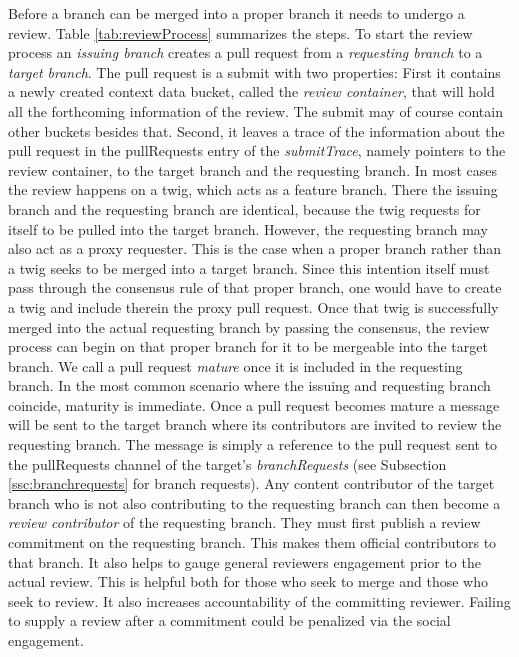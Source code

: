 Before a branch can be merged into a proper branch it needs to undergo a review. Table \ref{tab:reviewProcess} summarizes the steps.
To start the review process an \textit{issuing branch} creates a pull request from a \textit{requesting branch} to a \textit{target branch}. The pull request is a submit with two properties: First it contains a newly created context data bucket, called the \textit{review container}, that will hold all the forthcoming information of the review. The submit may of course contain other buckets besides that. Second, it leaves a trace of the information about the pull request in the pullRequests entry of the \textit{submitTrace}, namely pointers to the review container, to the target branch and the requesting branch. In most cases the review happens on a twig, which acts as a feature branch. There the issuing branch and the requesting branch are identical, because the twig requests for itself to be pulled into the target branch. However, the requesting branch may also act as a proxy requester. This is the case when a proper branch rather than a twig seeks to be merged into a target branch. Since this intention itself must pass through the consensus rule of that proper branch, one would have to create a twig and include therein the proxy pull request. Once that twig is successfully merged into the actual requesting branch by passing the consensus, the review process can begin on that proper branch for it to be mergeable into the target branch. We call a pull request \textit{mature} once it is included in the requesting branch. In the most common scenario where the issuing and requesting branch coincide, maturity is immediate. 
Once a pull request becomes mature a message will be sent to the target branch  where its contributors are invited to review the requesting branch. The message is simply a reference to the pull request sent to the pullRequests channel of the target's \textit{branchRequests} (see Subsection \ref{ssc:branchrequests} for branch requests).
Any content contributor of the target branch who is not also contributing to the requesting branch can then become a \textit{review contributor} of the requesting branch. They must first publish a review commitment on the requesting branch. This makes them official contributors to that branch. It also helps to gauge general reviewers engagement prior to the actual review. This is helpful both for those who seek to merge and those who seek to review. It also increases accountability of the committing reviewer. Failing to supply a review after a commitment could be penalized via the social engagement.  
